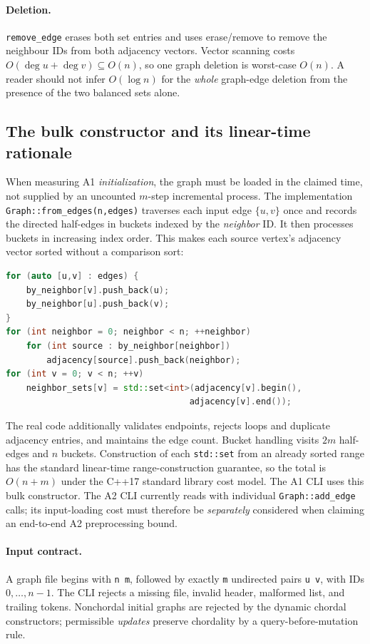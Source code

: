 \paragraph{Deletion.} \texttt{remove\_edge} erases both set entries and uses erase/remove to remove the neighbour IDs from both adjacency vectors.  Vector scanning costs \(O(\deg u+\deg v)\subseteq O(n)\), so one graph deletion is worst-case \(O(n)\).  A reader should not infer \(O(\log n)\) for the \emph{whole} graph-edge deletion from the presence of the two balanced sets alone.

\subsection{The bulk constructor and its linear-time rationale}
When measuring A1 \emph{initialization}, the graph must be loaded in the claimed time, not supplied by an uncounted \(m\)-step incremental process.  The implementation \texttt{Graph::from\_edges(n,edges)} traverses each input edge \(\{u,v\}\) once and records the directed half-edges in buckets indexed by the \emph{neighbor} ID.  It then processes buckets in increasing index order.  This makes each source vertex's adjacency vector sorted without a comparison sort:
\begin{lstlisting}[language=C++,caption={Conceptual bulk-loader loop; see src/graph.cpp.}]
for (auto [u,v] : edges) {
    by_neighbor[v].push_back(u);
    by_neighbor[u].push_back(v);
}
for (int neighbor = 0; neighbor < n; ++neighbor)
    for (int source : by_neighbor[neighbor])
        adjacency[source].push_back(neighbor);
for (int v = 0; v < n; ++v)
    neighbor_sets[v] = std::set<int>(adjacency[v].begin(),
                                    adjacency[v].end());
\end{lstlisting}
The real code additionally validates endpoints, rejects loops and duplicate adjacency entries, and maintains the edge count.  Bucket handling visits \(2m\) half-edges and \(n\) buckets.  Construction of each \texttt{std::set} from an already sorted range has the standard linear-time range-construction guarantee, so the total is \(O(n+m)\) under the C++17 standard library cost model.  The A1 CLI uses this bulk constructor.  The A2 CLI currently reads with individual \texttt{Graph::add\_edge} calls; its input-loading cost must therefore be \emph{separately} considered when claiming an end-to-end A2 preprocessing bound.

\paragraph{Input contract.} A graph file begins with \texttt{n m}, followed by exactly \texttt{m} undirected pairs \texttt{u v}, with IDs \(0,\ldots,n-1\).  The CLI rejects a missing file, invalid header, malformed list, and trailing tokens.  Nonchordal initial graphs are rejected by the dynamic chordal constructors; permissible \emph{updates} preserve chordality by a query-before-mutation rule.

